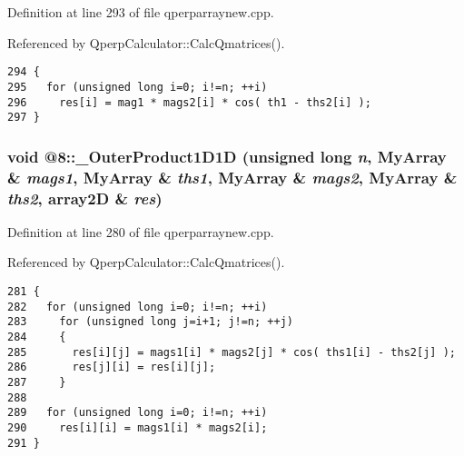 Definition at line 293 of file qperparraynew.cpp.

Referenced by QperpCalculator::CalcQmatrices().

\begin{Code}\begin{verbatim}294 {
295   for (unsigned long i=0; i!=n; ++i)
296     res[i] = mag1 * mags2[i] * cos( th1 - ths2[i] );
297 }
\end{verbatim}
\end{Code}


\subsubsection{\setlength{\rightskip}{0pt plus 5cm}void @8::\_\-OuterProduct1D1D (unsigned long {\em n}, MyArray \& {\em mags1}, MyArray \& {\em ths1}, MyArray \& {\em mags2}, MyArray \& {\em ths2}, array2D \& {\em res})\hspace{0.3cm}{\tt  [static]}}\label{qperparraynew_8cpp_7d756d821e729c3031739ae9168483e4}




Definition at line 280 of file qperparraynew.cpp.

Referenced by QperpCalculator::CalcQmatrices().

\begin{Code}\begin{verbatim}281 {
282   for (unsigned long i=0; i!=n; ++i)
283     for (unsigned long j=i+1; j!=n; ++j)
284     {
285       res[i][j] = mags1[i] * mags2[j] * cos( ths1[i] - ths2[j] );
286       res[j][i] = res[i][j];
287     }
288   
289   for (unsigned long i=0; i!=n; ++i)
290     res[i][i] = mags1[i] * mags2[i];
291 }
\end{verbatim}
\end{Code}


